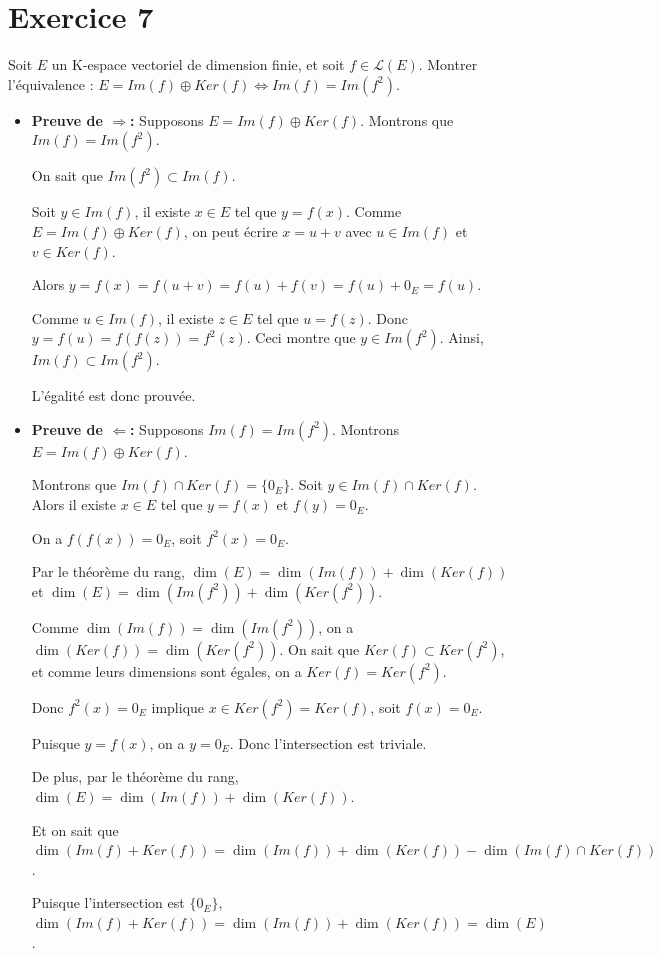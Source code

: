 \documentclass[french]{yLectureNote}
\begin{document}
\section*{Exercice 7}

Soit $E$ un K-espace vectoriel de dimension finie, et soit $f\in\mathcal{L}(E)$. Montrer l'équivalence : $E=Im(f)\oplus Ker(f)\iff Im(f)=Im(f^{2})$.

\begin{itemize}
    \item \textbf{Preuve de $\Rightarrow$:} Supposons $E=Im(f)\oplus Ker(f)$. Montrons que $Im(f)=Im(f^2)$.

    On sait que $Im(f^2) \subset Im(f)$.

    Soit $y \in Im(f)$, il existe $x \in E$ tel que $y=f(x)$. Comme $E = Im(f) \oplus Ker(f)$, on peut écrire $x=u+v$ avec $u \in Im(f)$ et $v \in Ker(f)$.

    Alors $y=f(x)=f(u+v)=f(u)+f(v)=f(u)+0_E=f(u)$.

    Comme $u \in Im(f)$, il existe $z \in E$ tel que $u=f(z)$. Donc $y=f(u)=f(f(z))=f^2(z)$.
    Ceci montre que $y \in Im(f^2)$. Ainsi, $Im(f) \subset Im(f^2)$.

    L'égalité est donc prouvée.

    \item \textbf{Preuve de $\Leftarrow$:} Supposons $Im(f)=Im(f^2)$. Montrons $E=Im(f)\oplus Ker(f)$.

    Montrons que $Im(f) \cap Ker(f) = \{0_E\}$. Soit $y \in Im(f) \cap Ker(f)$. Alors il existe $x \in E$ tel que $y=f(x)$ et $f(y)=0_E$.

    On a $f(f(x))=0_E$, soit $f^2(x)=0_E$.

    Par le théorème du rang, $\dim(E)=\dim(Im(f))+\dim(Ker(f))$ et $\dim(E)=\dim(Im(f^2))+\dim(Ker(f^2))$.

    Comme $\dim(Im(f))=\dim(Im(f^2))$, on a $\dim(Ker(f))=\dim(Ker(f^2))$.
    On sait que $Ker(f) \subset Ker(f^2)$, et comme leurs dimensions sont égales, on a $Ker(f)=Ker(f^2)$.

    Donc $f^2(x)=0_E$ implique $x \in Ker(f^2)=Ker(f)$, soit $f(x)=0_E$.

    Puisque $y=f(x)$, on a $y=0_E$. Donc l'intersection est triviale.

    De plus, par le théorème du rang, $\dim(E)=\dim(Im(f))+\dim(Ker(f))$.

    Et on sait que $\dim(Im(f)+Ker(f)) = \dim(Im(f))+\dim(Ker(f))-\dim(Im(f)\cap Ker(f))$.

    Puisque l'intersection est $\{0_E\}$, $\dim(Im(f)+Ker(f)) = \dim(Im(f))+\dim(Ker(f)) = \dim(E)$.


\end{itemize}
\end{document}
